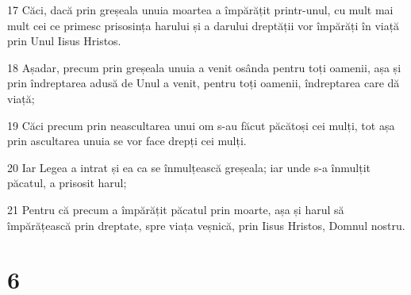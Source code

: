 \par 17 Căci, dacă prin greșeala unuia moartea a împărățit printr-unul, cu mult mai mult cei ce primesc prisosința harului și a darului dreptății vor împărăți în viață prin Unul Iisus Hristos.
\par 18 Așadar, precum prin greșeala unuia a venit osânda pentru toți oamenii, așa și prin îndreptarea adusă de Unul a venit, pentru toți oamenii, îndreptarea care dă viață;
\par 19 Căci precum prin neascultarea unui om s-au făcut păcătoși cei mulți, tot așa prin ascultarea unuia se vor face drepți cei mulți.
\par 20 Iar Legea a intrat și ea ca se înmulțească greșeala; iar unde s-a înmulțit păcatul, a prisosit harul;
\par 21 Pentru că precum a împărățit păcatul prin moarte, așa și harul să împărățească prin dreptate, spre viața veșnică, prin Iisus Hristos, Domnul nostru.

\chapter{6}

